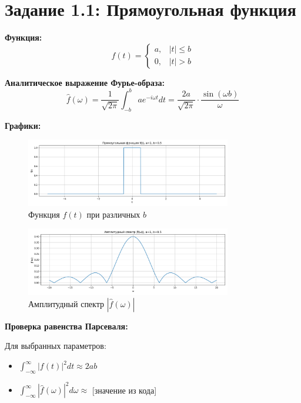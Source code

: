 \section*{Задание 1.1: Прямоугольная функция}

\textbf{Функция:}
\[
f(t) = 
\begin{cases}
a, & |t| \le b \\
0, & |t| > b
\end{cases}
\]

\textbf{Аналитическое выражение Фурье-образа:}
\[
\hat{f}(\omega) = \frac{1}{\sqrt{2\pi}} \int_{-b}^{b} a e^{-i \omega t} dt = \frac{2a}{\sqrt{2\pi}} \cdot \frac{\sin(\omega b)}{\omega}
\]

\textbf{Графики:}

\begin{figure}[h!]
    \centering
    \includegraphics[width=0.8\textwidth]{rect_function.png}
    \caption{Функция $f(t)$ при различных $b$}
\end{figure}

\begin{figure}[h!]
    \centering
    \includegraphics[width=0.8\textwidth]{rect_fourier.png}
    \caption{Амплитудный спектр $|\hat{f}(\omega)|$}
\end{figure}

\textbf{Проверка равенства Парсеваля:}

Для выбранных параметров:
\begin{itemize}
    \item $\displaystyle \int_{-\infty}^{\infty} |f(t)|^2 dt \approx 2ab$
    \item $\displaystyle \int_{-\infty}^{\infty} |\hat{f}(\omega)|^2 d\omega \approx$ [значение из кода]
\end{itemize}

